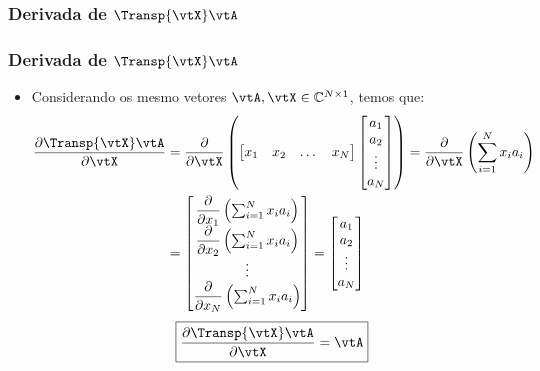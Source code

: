 \subsubsection{Derivada de $\Transp{\vtX} \vtA$}
\begin{frame}
	\frametitle{\normalsize Derivada de $\Transp{\vtX} \vtA$}
	\begin{itemize}
		\item Considerando os mesmo vetores $\vtA, \vtX \in \mathbb{C}^{N \times 1}$, temos que:
		{\tiny
		\begin{align*}
			\dfrac{\partial \Transp{\vtX} \vtA}{\partial \vtX} &= \frac{\partial}{\partial \vtX} \left(
			\begin{bmatrix}
				x_1 & x_2 & \dots & x_N
			\end{bmatrix} \begin{bmatrix}
				a_{1} \\ a_{2} \\ \vdots \\ a_{N}
			\end{bmatrix} \right) 
			= \frac{\partial}{\partial \vtX} \left( \sum_{i = 1}^N x_ia_i \right) \\
			&= \begin{bmatrix}
				\dfrac{\partial}{\partial x_1} \left( \sum_{i = 1}^N x_ia_i \right) \\ \dfrac{\partial}{\partial x_2} \left( \sum_{i = 1}^N x_ia_i \right) \\ \vdots \\ \dfrac{\partial}{\partial x_N} \left( \sum_{i = 1}^N x_ia_i \right) 
			\end{bmatrix} 
			= \begin{bmatrix}
				a_1 \\ a_2 \\ \vdots \\ a_N
			\end{bmatrix}
		\end{align*}}
		\[
			\boxed{\frac{\partial \Transp{\vtX} \vtA}{\partial \vtX} = \vtA}
		\]
	\end{itemize}
\end{frame}

